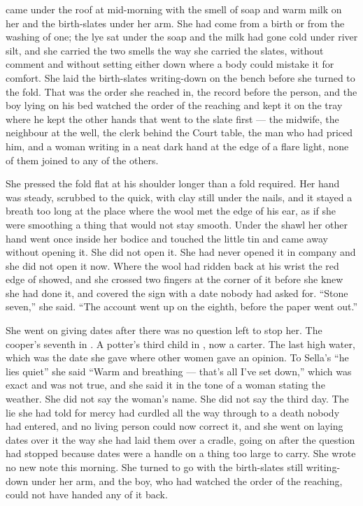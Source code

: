 \scenebreak

 came under the roof at mid-morning with the smell of soap and warm milk on her and the birth-slates under her arm. She had come from a birth or from the washing of one; the lye sat under the soap and the milk had gone cold under river silt, and she carried the two smells the way she carried the slates, without comment and without setting either down where a body could mistake it for comfort. She laid the birth-slates writing-down on the bench before she turned to the fold. That was the order she reached in, the record before the person, and the boy lying on his bed watched the order of the reaching and kept it on the tray where he kept the other hands that went to the slate first --- the midwife, the neighbour at the well, the clerk behind the Court table, the man who had priced him, and a woman writing in a neat dark hand at the edge of a flare light, none of them joined to any of the others.

She pressed the fold flat at his shoulder longer than a fold required. Her hand was steady, scrubbed to the quick, with clay still under the nails, and it stayed a breath too long at the place where the wool met the edge of his ear, as if she were smoothing a thing that would not stay smooth. Under the shawl her other hand went once inside her bodice and touched the little tin and came away without opening it. She did not open it. She had never opened it in company and she did not open it now. Where the wool had ridden back at his wrist the red edge of  showed, and she crossed two fingers at the corner of it before she knew she had done it, and covered the sign with a date nobody had asked for. “Stone seven,” she said. “The account went up on the eighth, before the paper went out.”

She went on giving dates after there was no question left to stop her. The cooper's seventh in . A potter's third child in , now a carter. The last high water, which was the date she gave where other women gave an opinion. To Sella's “he lies quiet” she said “Warm and breathing --- that's all I've set down,” which was exact and was not true, and she said it in the tone of a woman stating the weather. She did not say the woman's name. She did not say the third day. The lie she had told for mercy had curdled all the way through to a death nobody had entered, and no living person could now correct it, and she went on laying dates over it the way she had laid them over a cradle, going on after the question had stopped because dates were a handle on a thing too large to carry. She wrote no new note this morning. She turned to go with the birth-slates still writing-down under her arm, and the boy, who had watched the order of the reaching, could not have handed any of it back.

